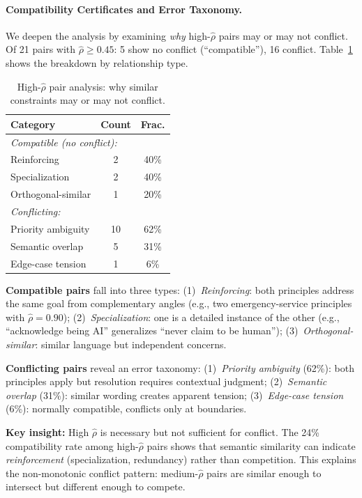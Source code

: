 \documentclass{article}
\theoremstyle{plain}
\theoremstyle{definition}
\theoremstyle{remark}
\newcommand{\rhohat}{\hat{\rho}}
\begin{document}
\paragraph{Compatibility Certificates and Error Taxonomy.}\label{par:certificates}
We deepen the analysis by examining \emph{why} high-$\rhohat$ pairs may or may not conflict. Of 21 pairs with $\rhohat \ge 0.45$: 5 show no conflict (``compatible''), 16 conflict. Table~\ref{tab:compatibility_taxonomy} shows the breakdown by relationship type.

\begin{table}[ht]
\centering
\small
\caption{High-$\rhohat$ pair analysis: why similar constraints may or may not conflict.}
\label{tab:compatibility_taxonomy}
\begin{tabular}{lcc}
\toprule
\textbf{Category} & \textbf{Count} & \textbf{Frac.} \\
\midrule
\multicolumn{3}{l}{\textit{Compatible (no conflict):}} \\
\quad Reinforcing & 2 & 40\% \\
\quad Specialization & 2 & 40\% \\
\quad Orthogonal-similar & 1 & 20\% \\
\midrule
\multicolumn{3}{l}{\textit{Conflicting:}} \\
\quad Priority ambiguity & 10 & 62\% \\
\quad Semantic overlap & 5 & 31\% \\
\quad Edge-case tension & 1 & 6\% \\
\bottomrule
\end{tabular}
\end{table}

\noindent \textbf{Compatible pairs} fall into three types: (1)~\emph{Reinforcing}: both principles address the same goal from complementary angles (e.g., two emergency-service principles with $\rhohat{=}0.90$); (2)~\emph{Specialization}: one is a detailed instance of the other (e.g., ``acknowledge being AI'' generalizes ``never claim to be human''); (3)~\emph{Orthogonal-similar}: similar language but independent concerns.

\noindent \textbf{Conflicting pairs} reveal an error taxonomy: (1)~\emph{Priority ambiguity} (62\%): both principles apply but resolution requires contextual judgment; (2)~\emph{Semantic overlap} (31\%): similar wording creates apparent tension; (3)~\emph{Edge-case tension} (6\%): normally compatible, conflicts only at boundaries.

\noindent \textbf{Key insight:} High $\rhohat$ is necessary but not sufficient for conflict. The 24\% compatibility rate among high-$\rhohat$ pairs shows that semantic similarity can indicate \emph{reinforcement} (specialization, redundancy) rather than competition. This explains the non-monotonic conflict pattern: medium-$\rhohat$ pairs are similar enough to intersect but different enough to compete.
\end{document}
